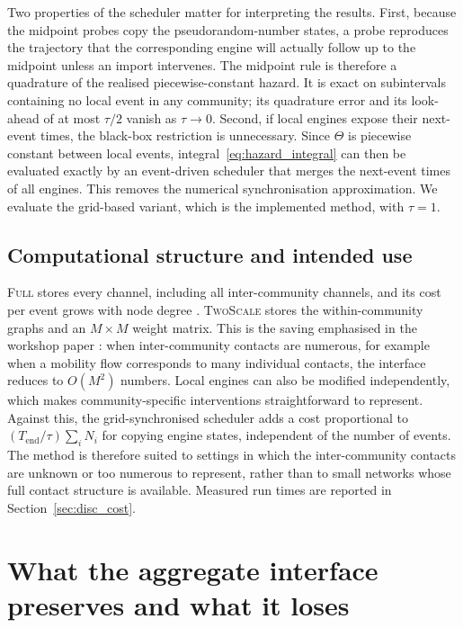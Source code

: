 \documentclass[a4paper,fleqn]{cas-sc}
\newcommand{\Full}{\textup{\textsc{Full}}}
\newcommand{\TS}{\textup{\textsc{TwoScale}}}
\begin{document}
Two properties of the scheduler matter for interpreting the results. First, because the midpoint probes copy the pseudorandom-number states, a probe reproduces the trajectory that the corresponding engine will actually follow up to the midpoint unless an import intervenes. The midpoint rule is therefore a quadrature of the realised piecewise-constant hazard. It is exact on subintervals containing no local event in any community; its quadrature error and its look-ahead of at most $\tau/2$ vanish as $\tau\to0$. Second, if local engines expose their next-event times, the black-box restriction is unnecessary. Since $\Theta$ is piecewise constant between local events, integral~\eqref{eq:hazard_integral} can then be evaluated exactly by an event-driven scheduler that merges the next-event times of all engines. This removes the numerical synchronisation approximation. We evaluate the grid-based variant, which is the implemented method, with $\tau=1$.

\subsection{Computational structure and intended use}
\label{sec:cost}

\Full{} stores every channel, including all inter-community channels, and its cost per event grows with node degree \citep{kuryliak2025simulating}. \TS{} stores the within-community graphs and an $M\times M$ weight matrix. This is the saving emphasised in the workshop paper \citep{kuryliak2025towards}: when inter-community contacts are numerous, for example when a mobility flow corresponds to many individual contacts, the interface reduces to $O(M^2)$ numbers. Local engines can also be modified independently, which makes community-specific interventions straightforward to represent. Against this, the grid-synchronised scheduler adds a cost proportional to $(T_{\mathrm{end}}/\tau)\sum_iN_i$ for copying engine states, independent of the number of events. The method is therefore suited to settings in which the inter-community contacts are unknown or too numerous to represent, rather than to small networks whose full contact structure is available. Measured run times are reported in Section~\ref{sec:disc_cost}.

\clearpage
\section{What the aggregate interface preserves and what it loses}
\label{sec:analysis}
\end{document}
